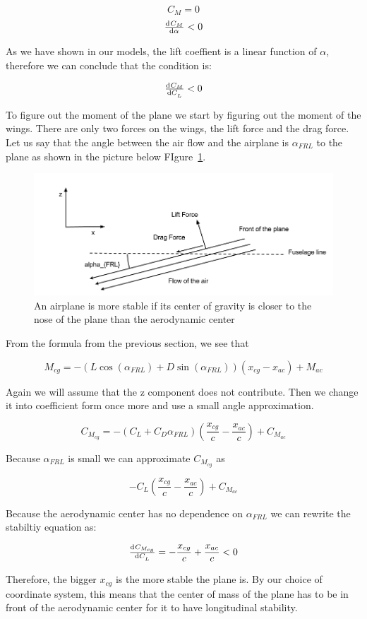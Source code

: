 \begin{equation}
C_M = 0
\end{equation}
\begin{equation}
\od{C_M}{\alpha} < 0
\label{eq:long_stability}
\end{equation}

As we have shown in our models, the lift coeffient is a linear function of $\alpha$, therefore
we can conclude that the condition is:

\[\od{C_M}{C_L} < 0 \]

To figure out the moment of the plane we start by figuring out the moment of the wings.
There are only two forces on the wings, the lift force and the drag force. Let us say
that the angle between the air flow and the airplane is $\alpha_{FRL}$ to the plane as shown in the picture below 
FIgure~\ref{fig:longitudinal_stability1}.

\begin{figure}[hl]
  \centering
    \includegraphics[scale=.5]{figures/longitudinal_stability1.png}
    \caption{An airplane is more stable if its center of gravity is closer to the nose of the plane than the
    aerodynamic center}
  \label{fig:longitudinal_stability1}
\end{figure}

From the formula from the previous section, we see that 

\[M_{cg}  = -(L\cos(\alpha_{FRL}) + D\sin(\alpha_{FRL}))(x_{cg} - x_{ac}) + M_{ac}\]

Again we will assume that the z component does not contribute. Then we change it into
coefficient form once more and use a small angle approximation.

\[ C_{M_{cg}} = -(C_{L} + C_D \alpha_{FRL}) (\frac{x_{cg}}{c} - \frac{x_{ac}}{c}) + C_{M_{ac}} \]

Because $\alpha_{FRL}$ is small we can approximate $C_{M_{cg}}$ as

\[-C_L (\frac{x_{cg}}{c} - \frac{x_{ac}}{c}) + C_{M_{ac}} \]

Because the aerodynamic center has no dependence on $\alpha_{FRL}$ we can rewrite the
stabiltiy equation as:

\[\od{C_{M_{cg}}}{C_L} = - \frac{x_{cg}}{c} + \frac{x_{ac}}{c} < 0\]

Therefore, the bigger $x_{cg}$ is the more stable the plane is. By our choice of coordinate system,
this means that the center of mass of the plane has to be in front of the aerodynamic center for it to have
longitudinal stability.

              

